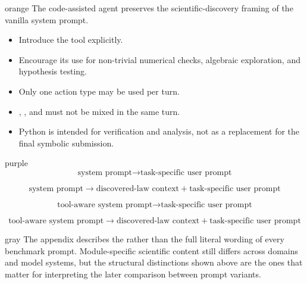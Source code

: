 \begin{promptbox}{orange}
\small
{} The code-assisted agent preserves the scientific-discovery framing of the vanilla system prompt.

\medskip
{}
\begin{itemize}
    \item Introduce the  tool explicitly.
    \item Encourage its use for non-trivial numerical checks, algebraic exploration, and hypothesis testing.
\end{itemize}

\begin{itemize}
    \item Only one action type may be used per turn.
    \item {}, , and  must not be mixed in the same turn.
    \item Python is intended for verification and analysis, not as a replacement for the final symbolic submission.
\end{itemize}
\end{promptbox}

\begin{promptbox}{purple}
\small
{}
\[
\text{system prompt} \rightarrow \text{task-specific user prompt}
\]

\[
\text{system prompt} \rightarrow \text{discovered-law context} + \text{task-specific user prompt}
\]

\[
\text{tool-aware system prompt} \rightarrow \text{task-specific user prompt}
\]

\[
\text{tool-aware system prompt} \rightarrow \text{discovered-law context} + \text{task-specific user prompt}
\]
\end{promptbox}

\begin{promptbox}{gray}
\small
The appendix describes the  rather than the full literal wording of every benchmark prompt. Module-specific scientific content still differs across domains and model systems, but the structural distinctions shown above are the ones that matter for interpreting the later comparison between prompt variants.
\end{promptbox}

